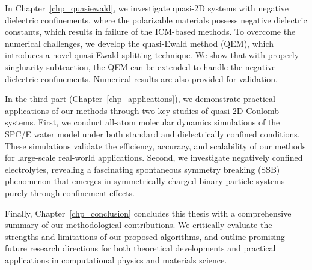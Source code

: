 In Chapter~\ref{chp_quasiewald}, we investigate quasi-2D systems with negative dielectric confinements, where the polarizable materials possess negative dielectric constants, which results in failure of the ICM-based methods.
To overcome the numerical challenges, we develop the quasi-Ewald method (QEM), which introduces a novel quasi-Ewald splitting technique.
We show that with properly singluarity subtraction, the QEM can be extended to handle the negative dielectric confinements.
Numerical results are also provided for validation.

In the third part (Chapter~\ref{chp_applications}), we demonstrate practical applications of our methods through two key studies of quasi-2D Coulomb systems. 
First, we conduct all-atom molecular dynamics simulations of the SPC/E water model under both standard and dielectrically confined conditions. 
These simulations validate the efficiency, accuracy, and scalability of our methods for large-scale real-world applications. 
Second, we investigate negatively confined electrolytes, revealing a fascinating spontaneous symmetry breaking (SSB) phenomenon that emerges in symmetrically charged binary particle systems purely through confinement effects.

Finally, Chapter~\ref{chp_conclusion} concludes this thesis with a comprehensive summary of our methodological contributions. 
We critically evaluate the strengths and limitations of our proposed algorithms, and outline promising future research directions for both theoretical developments and practical applications in computational physics and materials science.